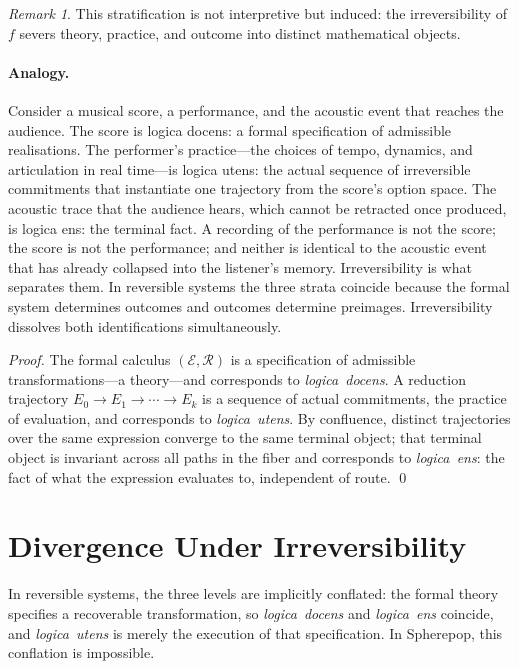 \documentclass[12pt, oneside]{amsbook}
\theoremstyle{plain}
\theoremstyle{definition}
\theoremstyle{remark}
\newtheorem{remark}[theorem]{Remark}
\newcommand{\Expr}{\mathcal{E}}
\newcommand{\evalf}{f}
\newcommand{\ruleR}{\mathcal{R}}
\newcommand{\docens}{\textit{logica~docens}}
\newcommand{\utens}{\textit{logica~utens}}
\newcommand{\ens}{\textit{logica~ens}}
\begin{document}
\begin{remark}
This stratification is not interpretive but induced: the irreversibility of
$\evalf$ severs theory, practice, and outcome into distinct mathematical
objects.

\paragraph{Analogy.}
Consider a musical score, a performance, and the acoustic event that reaches the audience. The score is logica docens: a formal specification of admissible realisations. The performer's practice---the choices of tempo, dynamics, and articulation in real time---is logica utens: the actual sequence of irreversible commitments that instantiate one trajectory from the score's option space. The acoustic trace that the audience hears, which cannot be retracted once produced, is logica ens: the terminal fact. A recording of the performance is not the score; the score is not the performance; and neither is identical to the acoustic event that has already collapsed into the listener's memory. Irreversibility is what separates them. In reversible systems the three strata coincide because the formal
system determines outcomes and outcomes determine preimages. Irreversibility
dissolves both identifications simultaneously.
\end{remark}

\begin{proof}
The formal calculus $(\Expr, \ruleR)$ is a specification of admissible
transformations---a theory---and corresponds to \docens{}. A reduction
trajectory $E_0 \to E_1 \to \cdots \to E_k$ is a sequence of actual
commitments, the practice of evaluation, and corresponds to \utens{}. By
confluence, distinct trajectories over the same expression converge to the same
terminal object; that terminal object is invariant across all paths in the fiber
and corresponds to \ens{}: the fact of what the expression evaluates to,
independent of route. \qed
\end{proof}

\section{Divergence Under Irreversibility}
\label{sec:priest:divergence}

In reversible systems, the three levels are implicitly conflated: the formal
theory specifies a recoverable transformation, so \docens{} and \ens{}
coincide, and \utens{} is merely the execution of that specification. In
Spherepop, this conflation is impossible.
\end{document}
